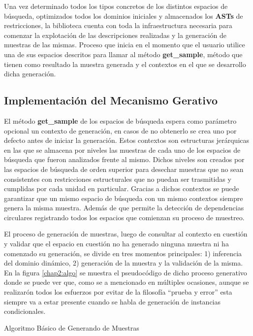 Una vez determinado todos los tipos concretos de los distintos espacios de búsqueda, optimizados todos los dominios iniciales y
almacenados los {\bf ASTs} de restricciones, la biblioteca cuenta con toda la infraestructura necesaria para comenzar la explotación
de las descripciones realizadas y la generación de muestras de las mismas. Proceso que inicia en el momento que el usuario
utilice una de sus espacios descritos para llamar al método {\bf get\_sample}, método que tienen como resultado la muestra generada y
el contextos en el que se desarrollo dicha generación.

\subsection{Implementación del Mecanismo Gerativo}

El método {\bf get\_sample} de los espacios de búsqueda espera como parámetro opcional un contexto de generación, en casos de no
obtenerlo se crea uno por defecto antes de iniciar la generación. Estos contextos son estructuras jerárquicas en las que se
almacena por niveles las muestras de cada uno de los espacios de búsqueda que fueron analizados frente al mismo. Dichos niveles
son creados por las espacios de búsqueda de orden superior para desechar muestras que no sean consistentes con restricciones
estructurales que no puedan ser trasmitidas y cumplidas por cada unidad en particular. Gracias a dichos contextos se puede
garantizar que un mismo espacio de búsqueda con un mismo contextos siempre genera la misma muestra. Además de que permite la
detección de dependencias circulares registrando todos los espacios que comienzan su proceso de muestreo.

El proceso de generación de muestras, luego de consultar al contexto en cuestión y validar que el espacio en cuestión no ha
generado ninguna muestra ni ha comenzado su generación, se divide en tres momentos principales: 1) inferencia del dominio
dinámico, 2) generación de la muestra y la validación de la misma. En la figura \ref{chap2:algo} se muestra el pseudocódigo de dicho
proceso generativo donde se puede ver que, como se a mencionado en múltiples ocasiones, aunque se realizarón todos los
esfuerzos por evitar de la filosofía “prueba y error” esta siempre va a estar presente cuando se habla de generación de
instancias condicionales.

\begin{algorithm}[H]
    \SetAlgoLined
    \caption{Algoritmo Básico de Generando de Muestras\label{chap2:algo}}
\end{algorithm}


